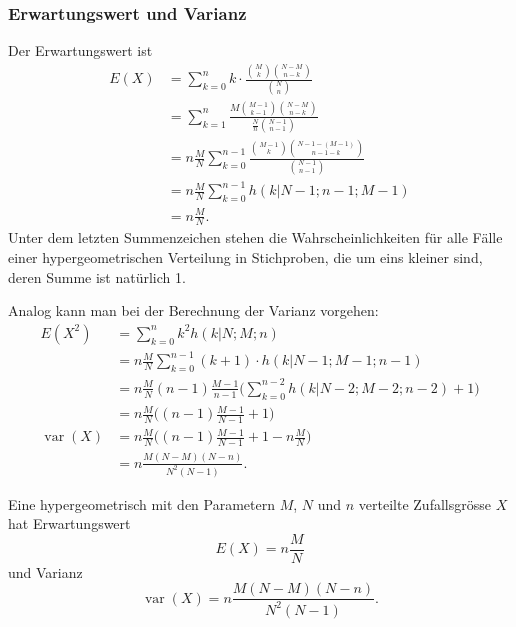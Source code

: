 \subsubsection{Erwartungswert und Varianz}
Der Erwartungswert ist
\begin{align*}
E(X)
&=\sum_{k=0}^n k\cdot\frac{\binom{M}{k}\binom{N-M}{n-k}}{\binom{N}{n}}\\
&=\sum_{k=1}^n \frac{M\binom{M-1}{k-1}\binom{N-M}{n-k}}{\frac{N}{n}\binom{N-1}{n-1}}\\
&=n\frac{M}{N}\sum_{k=0}^{n-1} \frac{\binom{M-1}{k}\binom{N-1-(M-1)}{n-1-k}}{\binom{N-1}{n-1}}\\
&=n\frac{M}{N}\sum_{k=0}^{n-1}h(k|N-1;n-1;M-1)\\
&=n\frac{M}{N}.
\end{align*}
Unter dem letzten Summenzeichen stehen die Wahrscheinlichkeiten für alle
Fälle einer hypergeometrischen Verteilung in Stichproben, die um eins kleiner
sind, deren Summe ist natürlich 1.

Analog kann man bei der Berechnung der Varianz vorgehen:
{\allowdisplaybreaks
\begin{align*}
E(X^2)
&=\sum_{k=0}^n k^2h(k|N;M;n)\\
&=n\frac{M}{N}\sum_{k=0}^{n-1} (k+1)\cdot h(k|N-1;M-1;n-1)\\
&=n\frac{M}{N}(n-1)\frac{M-1}{n-1}\biggl(\sum_{k=0}^{n-2} h(k|N-2;M-2;n-2)+1\biggr)\\
&=n\frac{M}{N}\biggl((n-1)\frac{M-1}{N-1}+1\biggr)\\
\operatorname{var}(X)
&=n\frac{M}{N}\biggl((n-1)\frac{M-1}{N-1}+1-n\frac{M}{N}\biggr)\\
&=n\frac{M(N-M)(N-n)}{N^2(N-1)}.
\end{align*}
}
\begin{satz}
Eine hypergeometrisch mit den Parametern $M$, $N$ und $n$
verteilte Zufallsgrösse $X$
hat Erwartungswert
\[
E(X)=n\frac{M}{N}
\]
und Varianz
\[
\operatorname{var}(X)=n\frac{M(N-M)(N-n)}{N^2(N-1)}.
\]
\end{satz}
